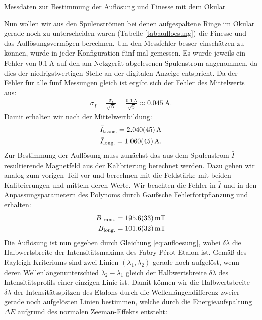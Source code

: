 \documentclass[11pt, a4paper]{article}
\begin{document}
\begin{table}[h]
	\centering
	
	\caption{Messdaten zur Bestimmung der Auflösung und Finesse mit dem Okular}
	\label{tab:aufloesung}
\end{table}
Nun wollen wir aus den Spulenströmen bei denen aufgespaltene Ringe im Okular gerade noch zu unterscheiden waren (Tabelle \ref{tab:aufloesung}) die Finesse und das Auflösungsvermögen berechnen.
Um den Messfehler besser einschätzen zu können, wurde in jeder Konfiguration fünf mal gemessen.
Es wurde jeweils ein Fehler von $\SI{0.1}{\ampere}$ auf den am Netzgerät abgelesenen Spulenstrom angenommen, da dies der niedrigstwertigen Stelle an der digitalen Anzeige entspricht.
Da der Fehler für alle fünf Messungen gleich ist ergibt sich der Fehler des Mittelwerts aus: 
\begin{align*}
	\sigma_{\bar{I}} = \frac{\sigma_I}{\sqrt{N}} = \frac{\SI{0,1}{\ampere}}{\sqrt{5}} \approx \SI{0,045}{\ampere}\text{.}
\end{align*}
Damit erhalten wir nach der Mittelwertbildung:
\begin{align*}
	\bar{I}_\mathrm{trans.} = \SI{2.040 +- 0.045}{\ampere} \\
	\bar{I}_\mathrm{long.} = \SI{1.060 +- 0.045}{\ampere}\text{.}
\end{align*}
Zur Bestimmung der Auflösung muss zunächst das aus dem Spulenstrom $\bar{I}$ resultierende Magnetfeld aus der Kalibrierung berechnet werden.
Dazu gehen wir analog zum vorigen Teil vor und berechnen mit die Feldstärke mit beiden Kalibrierungen und mitteln deren Werte.
Wir beachten die Fehler in $\bar{I}$ und in den Anpassungsparametern des Polynoms durch Gaußsche Fehlerfortpflanzung und erhalten:
\begin{align*}
	B_\mathrm{trans.} = \SI{195.6 +- 3.3}{\milli\tesla} \\
	B_\mathrm{long.} = \SI{101.6 +- 3.2}{\milli\tesla}
\end{align*}
Die Auflösung ist nun gegeben durch Gleichung \ref{eq:aufloesung}, wobei $\delta \lambda$ die Halbwertsbreite der Intensitätsmaxima des Fabry-Pérot-Etalon ist.
Gemäß des Rayleigh-Kriteriums sind zwei Linien $(\lambda_1, \lambda_2)$ gerade noch aufgelöst, wenn deren Wellenlängenunterschied $\lambda_2 - \lambda_1$ gleich der Halbwertsbreite $\delta \lambda$ des Intensitätsprofils einer einzigen Linie ist.
Damit können wir die Halbwertsbreite $\delta \lambda$ der Intensitätsspitzen des Etalons durch die Wellenlängendifferenz zweier gerade noch aufgelösten Linien bestimmen, welche durch die Energieaufspaltung $\Delta E$ aufgrund des normalen Zeeman-Effekts entsteht:
\end{document}
